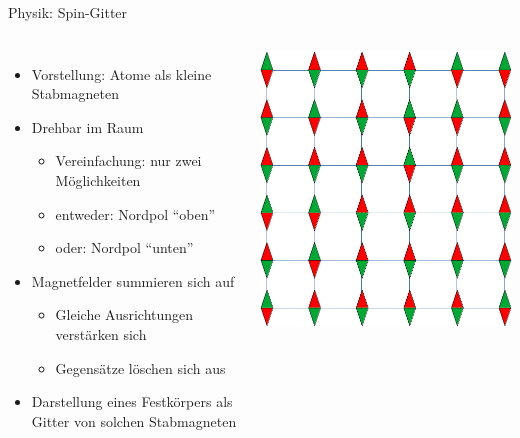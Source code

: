 \begin{frame}{Physik: Spin-Gitter}
%
\begin{columns}[T]
\begin{itemize}
\item Vorstellung: Atome als kleine Stabmagneten
\item Drehbar im Raum
	\begin{itemize}
	\item Vereinfachung: nur zwei Möglichkeiten
	\item entweder: Nordpol \enquote{oben}
	\item oder: Nordpol \enquote{unten}
	\end{itemize}
\item Magnetfelder summieren sich auf
	\begin{itemize}
	\item Gleiche Ausrichtungen verstärken sich
	\item Gegensätze löschen sich aus
	\end{itemize}
\item Darstellung eines Festkörpers als Gitter von solchen Stabmagneten
\end{itemize}
%
\includegraphics[width=.7\linewidth]{./gfx/spinLattice}
\end{columns}
%
\end{frame}


